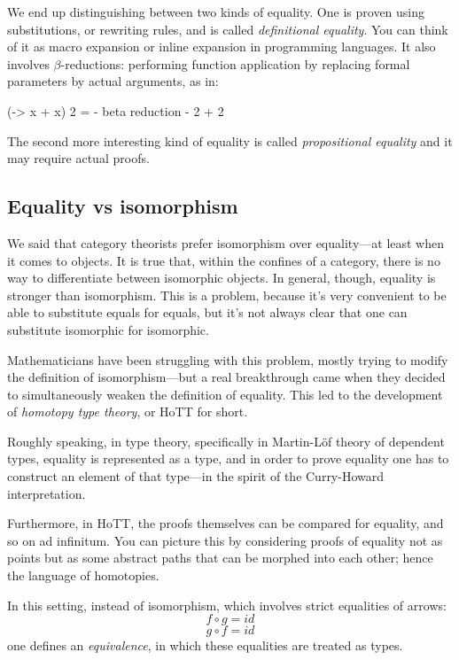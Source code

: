 \documentclass[DaoFP]{subfiles}
\begin{document}
We end up distinguishing between two kinds of equality. One is proven using substitutions, or rewriting rules, and is called \emph{definitional equality}. You can think of it as macro expansion or inline expansion in programming languages. It also involves $\beta$-reductions: performing function application by replacing formal parameters by actual arguments, as in:
\begin{haskell}
(\x -> x + x) 2 =
{- beta reduction -}
2 + 2
\end{haskell}

The second more interesting kind of equality is called \emph{propositional equality} and it may require actual proofs. 

\subsection{Equality vs isomorphism}

We said that category theorists prefer isomorphism over equality---at least when it comes to objects. It is true that, within the confines of a category, there is no way to differentiate between isomorphic objects. In general, though, equality is stronger than isomorphism. This is a problem, because it's very convenient to be able to substitute equals for equals, but it's not always clear that one can substitute isomorphic for isomorphic. 

Mathematicians have been struggling with this problem, mostly trying to modify the definition of isomorphism---but a real breakthrough came when they decided to simultaneously weaken the definition of equality. This led to the development of \emph{homotopy type theory}, or HoTT for short. 

Roughly speaking, in type theory, specifically in Martin-L{\"o}f theory of dependent types, equality is represented as a type, and in order to prove equality one has to construct an element of that type---in the spirit of the Curry-Howard interpretation. 

Furthermore, in HoTT, the proofs themselves can be compared for equality, and so on ad infinitum. You can picture this by considering proofs of equality not as points but as some abstract paths that can be morphed into each other; hence the language of homotopies.

In this setting, instead of isomorphism, which involves strict equalities of arrows:
\[ f \circ g = id \]
\[ g \circ f = id \]
one defines an \emph{equivalence}, in which these equalities are treated as types.
\end{document}
